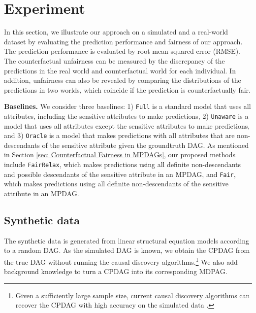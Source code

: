 \documentclass{article}
\begin{document}
\section{Experiment}\label{sec: Experiment}

In this section, we illustrate our approach on a simulated and a real-world dataset by evaluating the prediction performance and fairness of our approach. The prediction performance is evaluated by root mean squared error (RMSE). The counterfactual unfairness can be measured by the discrepancy of the predictions in the real world and counterfactual world for each individual. In addition, unfairness can also be revealed by comparing the distributions of the predictions in two worlds, which coincide if the prediction is counterfactually fair. 

\textbf{Baselines.} We consider three baselines: 1) \texttt{Full} is a standard model that uses all attributes, including the sensitive attributes to make predictions, 2) \texttt{Unaware} is a model that uses all attributes except the sensitive attributes to make predictions, and 3) \texttt{Oracle} is a model that makes predictions with all attributes that are non-descendants of the sensitive attribute given the groundtruth DAG. As mentioned in Section \ref{sec: Counterfactual Fairness in MPDAGs}, 
our proposed methods include \texttt{FairRelax}, which makes predictions using all definite non-descendants and possible descendants of the sensitive attribute in an MPDAG, and \texttt{Fair}, which makes predictions using all definite non-descendants of the sensitive attribute in an MPDAG.


\subsection{Synthetic data} \label{sec: Experiment/Synthetic Data}
The synthetic data is generated from linear structural equation models according to a random DAG. As the simulated DAG is known, we obtain the CPDAG from the true DAG without running the causal discovery algorithms.\footnote{Given a sufficiently large sample size, current causal discovery algorithms can recover the CPDAG with high accuracy on the simulated data \citep{glymour2019review}.} We also add background knowledge to turn a CPDAG into its corresponding MDPAG. 
\end{document}
